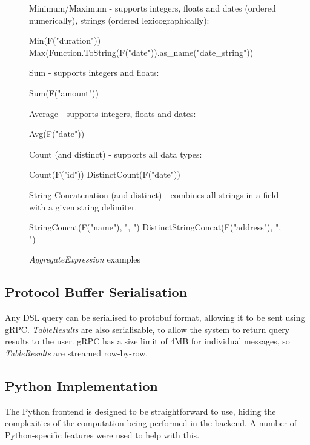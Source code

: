 
\begin{figure}[htp]
	Minimum/Maximum - supports integers, floats and dates (ordered numerically), strings (ordered lexicographically):
	\begin{python}
Min(F("duration"))
Max(Function.ToString(F("date")).as_name("date_string"))
	\end{python}

	Sum - supports integers and floats:
	\begin{python}
Sum(F("amount"))
	\end{python}
	
	Average - supports integers, floats and dates:
	\begin{python}
Avg(F("date"))
	\end{python}

	Count (and distinct) - supports all data types:
\begin{python}
Count(F("id"))
DistinctCount(F("date"))
\end{python}

	String Concatenation (and distinct) - combines all strings in a field with a given string delimiter.
\begin{python}
StringConcat(F("name"), ", ")
DistinctStringConcat(F("address"), ", ")
\end{python}
	\caption{\textit{AggregateExpression} examples}
	\label{fig:aggregate-expressions-all}
\end{figure}

\subsection{Protocol Buffer Serialisation}
Any DSL query can be serialised to protobuf format, allowing it to be sent using gRPC. \textit{TableResults} are also serialisable, to allow the system to return query results to the user. gRPC has a size limit of 4MB for individual messages, so \textit{TableResults} are streamed row-by-row.

\subsection{Python Implementation}\label{subsec:dsl-python}
The Python frontend is designed to be straightforward to use, hiding the complexities of the computation being performed in the backend. A number of Python-specific features were used to help with this.

